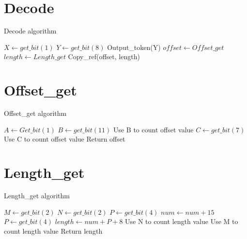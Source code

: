 \documentclass[10pt,letterpaper,pdftex]{article}
\begin{document}
\begin{CJK}{GBK}{song}

\section{Decode}

\begin{algorithm}
\caption{Decode algorithm}\label{encode}
\begin{algorithmic}[1]
 \State $X \gets get\_bit(1)$
  \State $Y \gets get\_bit(8)$
  \State Output\_token(Y)
 \Else
  \State $ offset \gets Offset\_get $
  \State $ length \gets Length\_get $
  \State Copy\_ref(offset, length)
 \EndIf
\EndWhile
\EndProcedure
\end{algorithmic}
\end{algorithm}

\newpage
\section{Offset\_get}

\begin{algorithm}
\caption{Offset\_get algorithm}\label{Offset_get}
\begin{algorithmic}[1]
 \State $ A \gets Get\_bit(1) $ 
  \State $ B \gets get\_bit(11) $
  \State Use B to count offset value
 \Else
  \State $ C \gets get\_bit(7) $
  \State Use C to count offset value
 \EndIf
 \State Return offset
\EndProcedure
\end{algorithmic}
\end{algorithm}

\newpage
\section{Length\_get}

\begin{algorithm}
\caption{Length\_get algorithm}\label{Length_get}
\begin{algorithmic}[1]
 \State  $ M \gets get\_bit(2) $
  \State $ N \gets get\_bit(2) $ 
   \State $ P \gets get\_bit(4) $
     \State $ num \gets num + 15 $
     \State $ P \gets get\_bit(4) $
   \EndWhile
   \State $ length \gets num + P + 8 $
  \Else
   \State Use N to count length value
  \EndIf
 \Else
  \State Use M to count length value
 \EndIf
 \State Return length
\EndProcedure
\end{algorithmic}
\end{algorithm}


\end{CJK}
\end{document}
